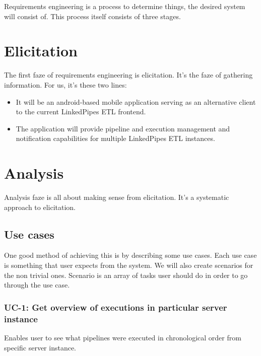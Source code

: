 Requirements engineering is a process to determine things, the desired system will consist of. This process itself consists of three stages. 

\section{Elicitation}
The first faze  of requirements engineering is elicitation. It's the faze of gathering information.
For us, it's these two lines:
\begin{itemize}
    \item It will be an android-based mobile application serving as an alternative client to the current LinkedPipes ETL frontend.
    \item The application will provide pipeline and execution management and notification capabilities for multiple LinkedPipes ETL instances.
\end{itemize}

\section{Analysis}
Analysis faze is all about making sense from elicitation. It's a systematic approach to elicitation.


\subsection{Use cases}
One good method of achieving this is by describing some use cases. Each use case is something that user expects from the system. We will also create scenarios for the non trivial ones. Scenario is an array of tasks user should do in order to go through the use case.

\subsubsection*{UC-1: Get overview of executions in particular server instance}
Enables user to see what pipelines were executed in chronological order from specific server instance.

